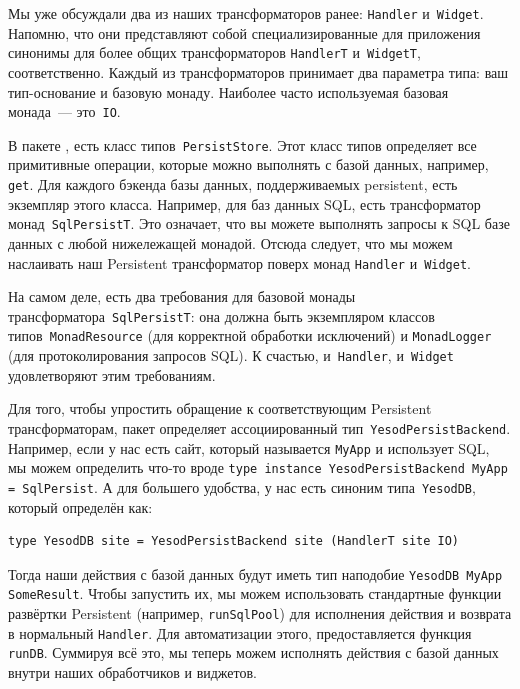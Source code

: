 Мы уже обсуждали два из наших трансформаторов ранее: \lstinline'Handler'
и~\lstinline'Widget'. Напомню, что они представляют собой специализированные
для приложения синонимы для более общих трансформаторов \lstinline'HandlerT'
и~\lstinline'WidgetT', соответственно. Каждый из трансформаторов принимает два
параметра типа: ваш тип-основание и базовую монаду. Наиболее часто используемая
базовая монада~--- это~\lstinline'IO'.

В пакете
, есть
класс типов~\lstinline'PersistStore'. Этот класс типов определяет все
примитивные операции, которые можно выполнять с базой данных, например,
\lstinline'get'. Для каждого бэкенда базы данных, поддерживаемых persistent,
есть экземпляр этого класса. Например, для баз данных SQL, есть трансформатор
монад~\lstinline'SqlPersistT'. Это означает, что вы можете выполнять запросы к
SQL базе данных с любой нижележащей монадой. Отсюда следует, что мы можем
наслаивать наш Persistent трансформатор поверх монад \lstinline'Handler'
и~\lstinline'Widget'.

\begin{remark}
    На самом деле, есть два требования для базовой монады
    трансформатора~\lstinline'SqlPersistT': она должна быть экземпляром классов
    типов~\lstinline'MonadResource' (для корректной обработки исключений) и
    \lstinline'MonadLogger' (для протоколирования запросов SQL). К счастью,
    и~\lstinline'Handler', и~\lstinline'Widget' удовлетворяют этим требованиям.
\end{remark}

Для того, чтобы упростить обращение к соответствующим Persistent
трансформаторам, пакет
определяет ассоциированный тип~\lstinline'YesodPersistBackend'. Например, если у
нас есть сайт, который называется \lstinline'MyApp' и использует SQL, мы можем
определить что-то вроде
\lstinline'type instance YesodPersistBackend MyApp = SqlPersist'. А для
большего удобства, у нас есть синоним типа~\lstinline'YesodDB', который
определён как:
\begin{lstlisting}
type YesodDB site = YesodPersistBackend site (HandlerT site IO)
\end{lstlisting}

Тогда наши действия с базой данных будут иметь тип наподобие
\lstinline'YesodDB MyApp SomeResult'. Чтобы запустить их, мы можем использовать
стандартные функции развёртки Persistent (например, \lstinline'runSqlPool') для
исполнения действия и возврата в нормальный \lstinline'Handler'. Для
автоматизации этого, предоставляется функция \lstinline'runDB'. Суммируя всё
это, мы теперь можем исполнять действия с базой данных внутри наших
обработчиков и виджетов.

